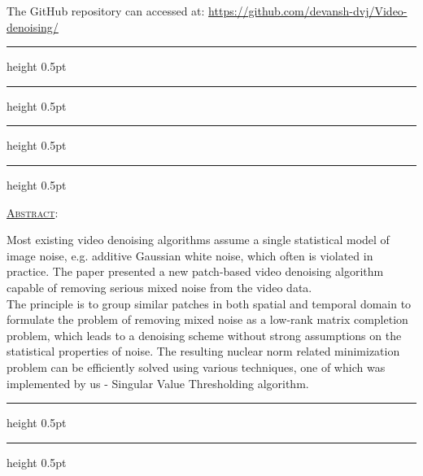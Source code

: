 \documentclass[fleqn, 11pt]{article}
\newcommand{\myline}{
  \par
  \kern3pt %
  \hrule height 0.5pt
  \kern2pt %
  \hrule height 0.5pt
  \kern3pt %
  \par
}
\begin{document}
The GitHub repository can accessed at: \url{https://github.com/devansh-dvj/Video-denoising/}

\vspace{7pt}

\myline

\newpage
\vspace{-2em}
\myline

\vspace{10pt}

\underline{\large {\textsc{Abstract}}}: 

\medskip  

Most existing video denoising algorithms assume a single statistical model of image noise, e.g. additive Gaussian white noise, which often is violated in practice. The paper presented a new patch-based video denoising algorithm capable of removing serious mixed noise from the video data. \\

The principle is to group similar patches in both spatial and temporal domain to formulate the problem of removing mixed noise as a low-rank matrix completion problem, which leads to a denoising scheme without strong assumptions on the statistical properties of noise. The resulting nuclear norm related minimization problem can be efficiently solved using various techniques, one of which was implemented by us - Singular Value Thresholding algorithm.\\



\vspace{7pt}

\myline 
\end{document}
